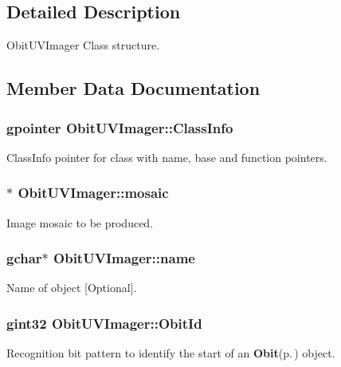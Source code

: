 \subsection{Detailed Description}
Obit\-UVImager Class structure. 



\subsection{Member Data Documentation}
\subsubsection{\setlength{\rightskip}{0pt plus 5cm}gpointer {\bf Obit\-UVImager::Class\-Info}}\label{structObitUVImager_o1}


Class\-Info pointer for class with name, base and function pointers. 

\subsubsection{$\ast$ {\bf Obit\-UVImager::mosaic}}\label{structObitUVImager_o6}


Image mosaic to be produced. 

\subsubsection{\setlength{\rightskip}{0pt plus 5cm}gchar$\ast$ {\bf Obit\-UVImager::name}}\label{structObitUVImager_o3}


Name of object [Optional]. 

\subsubsection{\setlength{\rightskip}{0pt plus 5cm}gint32 {\bf Obit\-UVImager::Obit\-Id}}\label{structObitUVImager_o0}


Recognition bit pattern to identify the start of an {\bf Obit}{\rm (p.\,\pageref{structObit})} object. 

